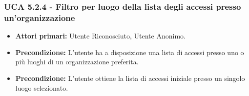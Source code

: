 \subsubsection{UCA 5.2.4 - Filtro per luogo della lista degli accessi presso un'organizzazione}
\begin{itemize}
    \item \textbf{Attori primari:} Utente Riconosciuto, Utente Anonimo.
    \item \textbf{Precondizione:} L'utente ha a disposizione una lista di accessi presso uno o più luoghi di un organizzazione preferita.
    \item \textbf{Precondizione:} L'utente ottiene la lista di accessi iniziale presso un singolo luogo selezionato.
\end{itemize}